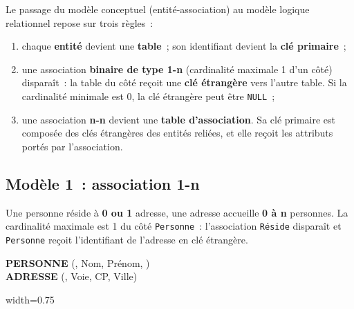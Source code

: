 \noindent Le passage du modèle conceptuel (entité-association) au modèle logique relationnel repose sur trois règles~:
\begin{enumerate}
	\item chaque \textbf{entité} devient une \textbf{table}~; son identifiant devient la \textbf{clé primaire}~;
	\item une association \textbf{binaire de type 1-n} (cardinalité maximale 1 d'un côté) disparaît~: la table du côté  \fg{} reçoit une \textbf{clé étrangère} vers l'autre table. Si la cardinalité minimale est 0, la clé étrangère peut être \texttt{NULL}~;
	\item une association \textbf{n-n} devient une \textbf{table d'association}. Sa clé primaire est composée des clés étrangères des entités reliées, et elle reçoit les attributs portés par l'association.
\end{enumerate}

\newpage
\subsection*{Modèle 1~: association 1-n}
{}

\noindent Une personne réside à \textbf{0 ou 1} adresse, une adresse accueille \textbf{0 à n} personnes. La cardinalité maximale est 1 du côté \texttt{Personne}~: l'association \texttt{Réside} disparaît et \texttt{Personne} reçoit l'identifiant de l'adresse en clé étrangère.

\begin{tcolorbox}[colback=white, colframe=title1, title=MLD -- Modèle 1]
\textbf{PERSONNE} (, Nom, Prénom, ) \\
\textbf{ADRESSE} (, Voie, CP, Ville)
\end{tcolorbox}

\vspace{0.5cm}
\begin{center}
\begin{adjustbox}{width=0.75\linewidth}
\end{adjustbox}
\legende
\end{center}

